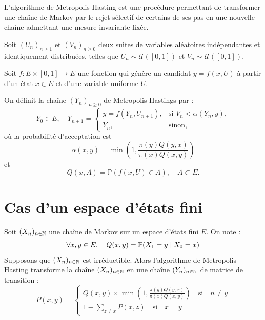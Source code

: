 \minitoc 


L'algorithme de Metropolis-Hasting est une procédure permettant de transformer une chaîne de Markov par le rejet 
sélectif de certains de ses pas en une nouvelle chaîne admettant une mesure invariante fixée. 

\begin{proposition}
    Soit $(U_n)_{n \ge 1}$ et $(V_n)_{n \ge 0}$ deux suites de variables aléatoires indépendantes et identiquement distribuées,  
    telles que $U_n \sim \mathcal{U}([0,1])$ et $V_n \sim \mathcal{U}([0,1])$.  

    Soit $f : E \times [0,1] \longrightarrow E$ une fonction qui génère un candidat $y = f(x,U)$ à partir d'un état $x \in E$ et d'une variable uniforme $U$.  

    On définit la chaîne $(Y_n)_{n \geqslant 0}$ de Metropolis-Hastings par :
        \[
            Y_0 \in E, \quad
            Y_{n+1} =
            \begin{cases}
                y = f(Y_n, U_{n+1}), & \text{si } V_n < \alpha(Y_n, y), \\
                Y_n, & \text{sinon},
            \end{cases}
        \]
    où la probabilité d'acceptation est
        \[
            \alpha(x,y) = \min\left(1, \frac{\pi(y) Q(y,x)}{\pi(x) Q(x,y)}\right)
        \]
    et
        \[
            Q(x,A) = \mathbb{P}(f(x,U) \in A), \quad A \subset E.
        \]
\end{proposition}



\section{Cas d'un espace d'états fini}

\begin{proposition}
    Soit $(X_n)_{n \in \mathbb{N}}$ une chaîne de Markov sur un espace d'états fini $E$. On note : 
        $$ \forall x,y \in E, \quad Q(x,y) = \mathbb{P}(X_1 = y \mid X_0 = x) $$
    Supposons que $(X_n)_{n \in \mathbb{N}}$ est irréductible. Alors l'algorithme de Metropolis-Hasting 
    transforme la chaîne $(X_n)_{n \in \mathbb{N}}$ en une chaîne $(Y_n)_{n \in \mathbb{N}}$ de matrice de transition : 
        $$ P(x,y) = 
            \begin{cases}
                Q(x,y) \times \min \left( 1, \frac{ \pi(y) Q(y,x)}{ \pi(x) Q(x,y)} \right) \quad \text{si} \quad n \not = y \\ 
                1 - \sum_{z \not = x} P(x,z) \quad \text{si} \quad x = y  
            \end{cases}
        $$ 
\end{proposition}

